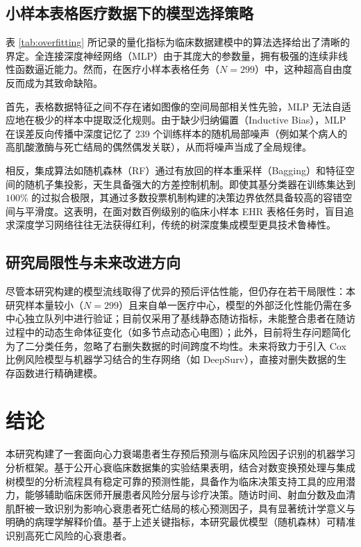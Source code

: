 \documentclass[11pt,a4paper]{ctexart} %
\begin{document}
\subsection{小样本表格医疗数据下的模型选择策略}
表 \ref{tab:overfitting} 所记录的量化指标为临床数据建模中的算法选择给出了清晰的界定。全连接深度神经网络（MLP）由于其庞大的参数量，拥有极强的连续非线性函数逼近能力。然而，在医疗小样本表格任务（$N=299$）中，这种超高自由度反而成为其致命缺陷。

首先，表格数据特征之间不存在诸如图像的空间局部相关性先验，MLP 无法自适应地在极少的样本中提取泛化规则\cite{shickel2018deep}。由于缺少归纳偏置（Inductive Bias），MLP 在误差反向传播中深度记忆了 239 个训练样本的随机局部噪声（例如某个病人的高肌酸激酶与死亡结局的偶然偶发关联），从而将噪声当成了全局规律。

相反，集成算法如随机森林（RF）通过有放回的样本重采样（Bagging）和特征空间的随机子集投影，天生具备强大的方差控制机制\cite{breiman2001random}。即使其基分类器在训练集达到 $100\%$ 的过拟合极限，其通过多数投票机制构建的决策边界依然具备较高的容错空间与平滑度。这表明，在面对数百例级别的临床小样本 EHR 表格任务时，盲目追求深度学习网络往往无法获得红利，传统的树深度集成模型更具技术鲁棒性。

\subsection{研究局限性与未来改进方向}
尽管本研究构建的模型流线取得了优异的预后评估性能，但仍存在若干局限性：本研究样本量较小（$N=299$）且来自单一医疗中心，模型的外部泛化性能仍需在多中心独立队列中进行验证；目前仅采用了基线静态随访指标，未能整合患者在随访过程中的动态生命体征变化（如多节点动态心电图）；此外，目前将生存问题简化为了二分类任务，忽略了右删失数据的时间跨度不均性\cite{katzman2018deepsurv}。未来将致力于引入 Cox 比例风险模型与机器学习结合的生存网络（如 DeepSurv），直接对删失数据的生存函数进行精确建模。


\section{结论}
本研究构建了一套面向心力衰竭患者生存预后预测与临床风险因子识别的机器学习分析框架。基于公开心衰临床数据集的实验结果表明，结合对数变换预处理与集成树模型的分析流程具有稳定可靠的预测性能，具备作为临床决策支持工具的应用潜力，能够辅助临床医师开展患者风险分层与诊疗决策。随访时间、射血分数及血清肌酐被一致识别为影响心衰患者死亡结局的核心预测因子，具有显著统计学意义与明确的病理学解释价值。基于上述关键指标，本研究最优模型（随机森林）可精准识别高死亡风险的心衰患者。
\end{document}
